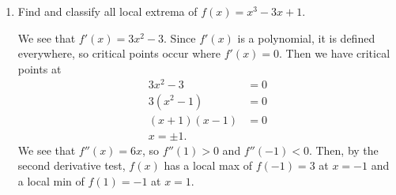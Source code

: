 \documentclass[11pt]{article}
\begin{document}
\pagestyle{empty}
\newsavebox{\quizfront}
\begin{lrbox}{\quizfront}
\begin{minipage}[top][3.5in][t]{\textwidth} \setlength{\parindent}{1.5em}
\drawtitle
\vspace{-0.5in}
\begin{enumerate}

\item Find and classify all local extrema of $f(x) = x^3-3x+1$.

  \vfill
  {\color{blue}

    We see that $f'(x) = 3x^2-3$. Since $f'(x)$ is a polynomial, it is
    defined everywhere, so critical points occur where $f'(x) =
    0$. Then we have critical points at
    \begin{align*}
      3x^2 - 3 &= 0\\
      3(x^2-1) &= 0\\
      (x+1)(x-1) &= 0\\
      x = \pm 1.
    \end{align*}
    We see that $f''(x) = 6x$, so $f''(1) > 0$ and $f''(-1) <
    0$. Then, by the second derivative test, $f(x)$ has a local max of
    $f(-1) = 3$ at $x= -1$ and a local min of $f(1) = -1$ at $x = 1$.

  }
  \vfill

\end{enumerate}


\end{minipage}
\end{lrbox}
\end{document}
